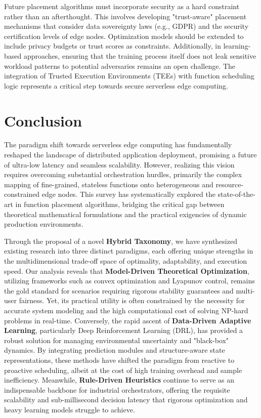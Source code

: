 \documentclass[lettersize,journal]{IEEEtran}
\begin{document}
Future placement algorithms must incorporate security as a hard constraint rather than an afterthought. This involves developing "trust-aware" placement mechanisms that consider data sovereignty laws (e.g., GDPR) and the security certification levels of edge nodes. Optimization models should be extended to include privacy budgets or trust scores as constraints. Additionally, in learning-based approaches, ensuring that the training process itself does not leak sensitive workload patterns to potential adversaries remains an open challenge. The integration of Trusted Execution Environments (TEEs) with function scheduling logic represents a critical step towards secure serverless edge computing.


\section{Conclusion}
\label{sec:conclusion}

The paradigm shift towards serverless edge computing has fundamentally reshaped the landscape of distributed application deployment, promising a future of ultra-low latency and seamless scalability. However, realizing this vision requires overcoming substantial orchestration hurdles, primarily the complex mapping of fine-grained, stateless functions onto heterogeneous and resource-constrained edge nodes. This survey has systematically explored the state-of-the-art in function placement algorithms, bridging the critical gap between theoretical mathematical formulations and the practical exigencies of dynamic production environments.

Through the proposal of a novel \textbf{Hybrid Taxonomy}, we have synthesized existing research into three distinct paradigms, each offering unique strengths in the multidimensional trade-off space of optimality, adaptability, and execution speed. Our analysis reveals that \textbf{Model-Driven Theoretical Optimization}, utilizing frameworks such as convex optimization and Lyapunov control, remains the gold standard for scenarios requiring rigorous stability guarantees and multi-user fairness. Yet, its practical utility is often constrained by the necessity for accurate system modeling and the high computational cost of solving NP-hard problems in real-time. Conversely, the rapid ascent of \textbf{Data-Driven Adaptive Learning}, particularly Deep Reinforcement Learning (DRL), has provided a robust solution for managing environmental uncertainty and "black-box" dynamics. By integrating prediction modules and structure-aware state representations, these methods have shifted the paradigm from reactive to proactive scheduling, albeit at the cost of high training overhead and sample inefficiency. Meanwhile, \textbf{Rule-Driven Heuristics} continue to serve as an indispensable backbone for industrial orchestrators, offering the requisite scalability and sub-millisecond decision latency that rigorous optimization and heavy learning models struggle to achieve.
\end{document}

